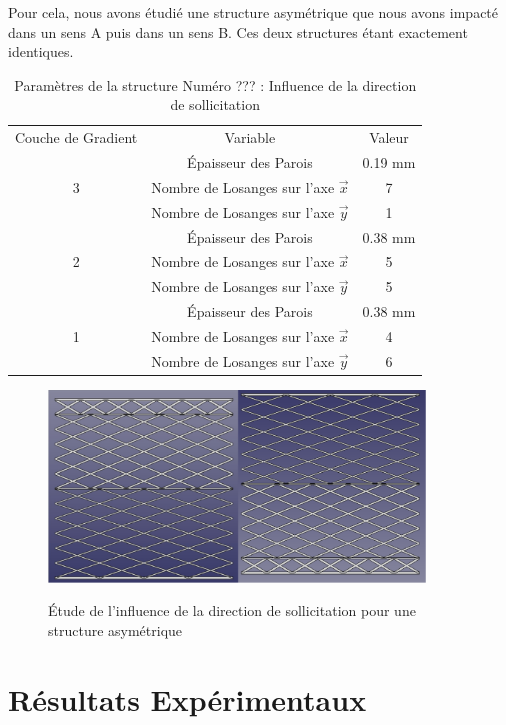 \documentclass[a4paper]{article}
\begin{document}
	Pour cela, nous avons étudié une structure asymétrique que nous avons impacté dans un sens A puis dans un sens B. Ces deux structures étant exactement identiques.
	
	\begin{table}[H]
		\centering
		\begin{tabular}{|c|c|c|}
			\hline
			\rowcolor{Gray}
			\multicolumn{3}{c}{Structure de Référence}\\\hline
			\rowcolor{Gray}
			Couche de Gradient & Variable & Valeur\\
			\hline\hline
			& Épaisseur des Parois & 0.19 mm\\
			3 & Nombre de Losanges sur l'axe $\vec{x}$ & 7\\
			& Nombre de Losanges sur l'axe $\vec{y}$ & 1\\
			\hline
			& Épaisseur des Parois & 0.38 mm\\
			2 & Nombre de Losanges sur l'axe $\vec{x}$ & 5\\
			& Nombre de Losanges sur l'axe $\vec{y}$ & 5\\
			\hline
			& Épaisseur des Parois & 0.38 mm\\
			1 & Nombre de Losanges sur l'axe $\vec{x}$ & 4\\
			& Nombre de Losanges sur l'axe $\vec{y}$ & 6\\
			\hline
		\end{tabular}
		\caption{Paramètres de la structure Numéro ??? : Influence de la direction de sollicitation}
	\end{table}
	
	\begin{figure}[H]
		\centering
		\includegraphics[width=10cm]{Images/6/directsol/directsol.pdf}\\
		\caption{Étude de l'influence de la direction de sollicitation pour une structure asymétrique}
	\end{figure}
	\newpage
	
	\section{Résultats Expérimentaux}
\end{document}
